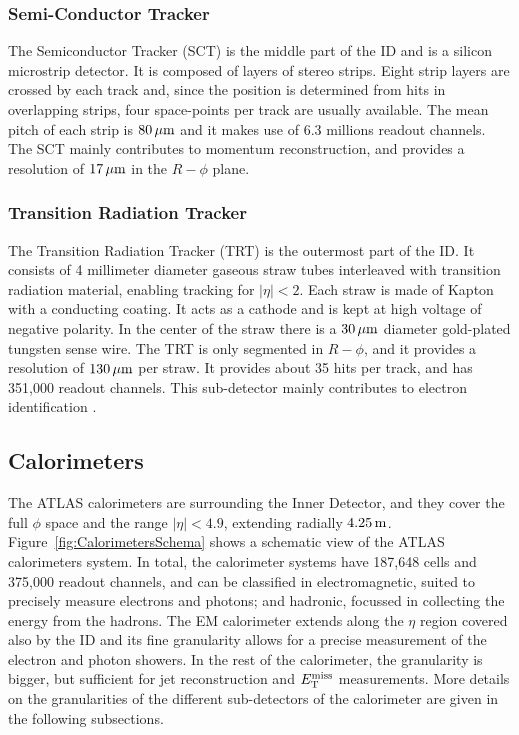 \subsubsection{Semi-Conductor Tracker}
    \label{subsubsec:SCT}

The Semiconductor Tracker (SCT) is the middle part of the ID and is a silicon microstrip detector. It is composed of layers of stereo strips. Eight strip layers are crossed by each track and, since the position is determined from hits in overlapping strips, four space-points per track are usually available.
The mean pitch of each strip is $\unit[80]{\mu m}$ and it makes use of 6.3 millions readout channels.
The SCT mainly contributes to momentum reconstruction, and provides a resolution of $\unit[17]{\mu m}$ in the $R-\phi$ plane.

\subsubsection{Transition Radiation Tracker}
    \label{subsubsec:TRT}

The Transition Radiation Tracker (TRT) is the outermost part of the ID. 
It consists of 4 millimeter diameter gaseous straw tubes interleaved with transition radiation material, enabling tracking for $|\eta|<2$.
Each straw is made of Kapton with a conducting coating.
It acts as a cathode and is kept at high voltage of negative polarity.
In the center of the straw there is a $\unit[30]{\mu m}$ diameter gold-plated tungsten sense wire.
The TRT is only segmented in $R-\phi$, and it provides a resolution of $\unit[130]{\mu m}$ per straw.
It provides about 35 hits per track, and has 351,000 readout channels.
This sub-detector mainly contributes to electron identification \cite{Aad:2011mk}.


\subsection{Calorimeters}
    \label{subsec:Calorimeters}

The ATLAS calorimeters are surrounding the Inner Detector, and they cover the full $\phi$ space and the range $|\eta|<4.9$, extending radially $\unit[4.25]{m}$. 
Figure~\ref{fig:CalorimetersSchema} shows a schematic view of the ATLAS calorimeters system.
In total, the calorimeter systems have 187,648 cells and 375,000 readout channels, and can be classified in electromagnetic, suited to precisely measure electrons and photons; and hadronic, focussed in collecting the energy from the hadrons. 
The EM calorimeter extends along the $\eta$ region covered also by the ID and its fine granularity allows for a precise measurement of the electron and photon showers.
In the rest of the calorimeter, the granularity is bigger, but sufficient for jet reconstruction and $E_{\mathrm{T}}^{\mathrm{miss}}$ measurements.
More details on the granularities of the different sub-detectors of the calorimeter are given in the following subsections.

